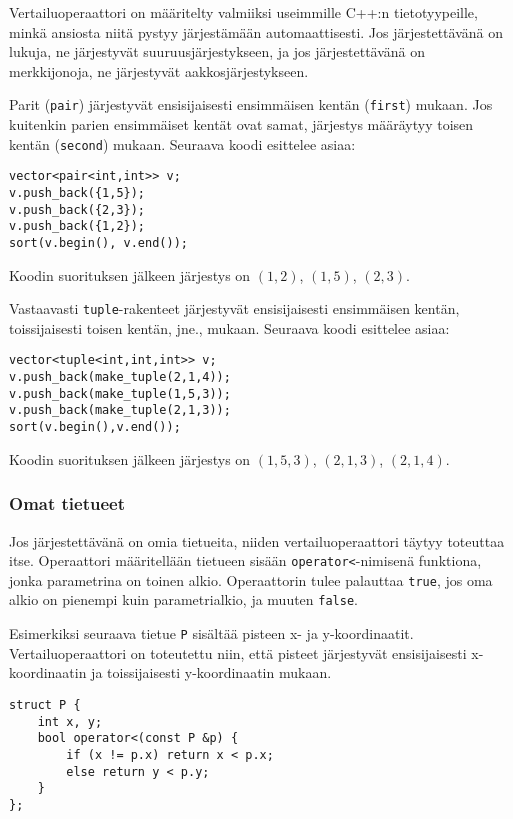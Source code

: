 Vertailuoperaattori on määritelty valmiiksi
useimmille C++:n tietotyypeille,
minkä ansiosta niitä pystyy järjestämään automaattisesti.
Jos järjestettävänä on lukuja, ne järjestyvät
suuruusjärjestykseen,
ja jos järjestettävänä on merkkijonoja,
ne järjestyvät aakkosjärjestykseen.


Parit (\texttt{pair}) järjestyvät ensisijaisesti
ensimmäisen kentän (\texttt{first}) mukaan.
Jos kuitenkin parien ensimmäiset kentät ovat samat,
järjestys määräytyy toisen kentän (\texttt{second}) mukaan.
Seuraava koodi esittelee asiaa:

\begin{lstlisting}
vector<pair<int,int>> v;
v.push_back({1,5});
v.push_back({2,3});
v.push_back({1,2});
sort(v.begin(), v.end());
\end{lstlisting}

Koodin suorituksen jälkeen järjestys on
$(1,2)$, $(1,5)$, $(2,3)$.

Vastaavasti \texttt{tuple}-rakenteet
järjestyvät ensisijaisesti ensimmäisen kentän,
toissijaisesti toisen kentän, jne., mukaan.
Seuraava koodi esittelee asiaa:
\begin{lstlisting}
vector<tuple<int,int,int>> v;
v.push_back(make_tuple(2,1,4));
v.push_back(make_tuple(1,5,3));
v.push_back(make_tuple(2,1,3));
sort(v.begin(),v.end());
\end{lstlisting}
Koodin suorituksen jälkeen järjestys on
$(1,5,3)$, $(2,1,3)$, $(2,1,4)$.

\subsubsection{Omat tietueet}

Jos järjestettävänä on omia tietueita,
niiden vertailuoperaattori täytyy toteuttaa itse.
Operaattori määritellään tietueen sisään
\texttt{operator<}-nimisenä funktiona,
jonka parametrina on toinen alkio.
Operaattorin tulee palauttaa \texttt{true},
jos oma alkio on pienempi kuin parametrialkio,
ja muuten \texttt{false}.

Esimerkiksi seuraava tietue \texttt{P}
sisältää pisteen x- ja y-koordinaatit.
Vertailuoperaattori on toteutettu niin,
että pisteet järjestyvät ensisijaisesti x-koor\-di\-naa\-tin
ja toissijaisesti y-koordinaatin mukaan.

\begin{lstlisting}
struct P {
    int x, y;
    bool operator<(const P &p) {
        if (x != p.x) return x < p.x;
        else return y < p.y;
    }
};
\end{lstlisting}

